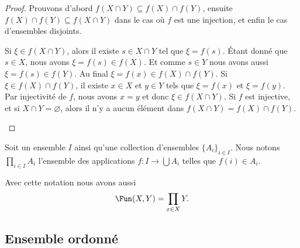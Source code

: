 \begin{proof}
	Prouvons d'abord \( f(X\cap Y) \subseteq f(X)\cap f(Y)\), ensuite \( f(X)\cap f(Y)\subseteq f(X\cap Y)\) dans le cas où \( f \) est une injection, et enfin le cas d'ensembles disjoints.
	\begin{subproof}
		Si \( \xi\in f(X\cap Y)\), alors il existe \( s\in X\cap Y\) tel que \( \xi=f(s)\). Étant donné que \( s\in X\), nous avons \( \xi=f(s)\in f(X)\). Et comme \( s\in Y\) nous avons aussi \( \xi=f(s)\in f(Y)\). Au final \( \xi=f(x)\in f(X)\cap f(Y)\).
		Si \( \xi\in f(X)\cap f(Y)\), il existe \( x\in X\) et \( y\in Y\) tels que \( \xi=f(x)\) et \( \xi=f(y)\). Par injectivité de \( f\), nous avons \( x=y\) et donc \( \xi\in f(X\cap Y)\).
		Si \( f \) est injective, et si \( X\cap Y = \varnothing \), alors il n'y a aucun élément dans \( f(X\cap Y)=f(X)\cap f(Y) \).
	\end{subproof}
\end{proof}

\begin{definition}	\label{DEFooTYIMooZUsYJw}
	Soit un ensemble \( I\) ainsi qu'une collection d'ensembles \( \{ A_i \}_{i\in I}\). Nous notons \( \prod_{i\in I}A_i\) l'ensemble des applications \(f \colon I\to \bigcup A_i  \) telles que \( f(i)\in A_i\).

	Avec cette notation nous avons aussi
	\begin{equation}
		\Fun(X,Y)=\prod_{x\in X}Y.
	\end{equation}
\end{definition}

\subsection{Ensemble ordonné}


